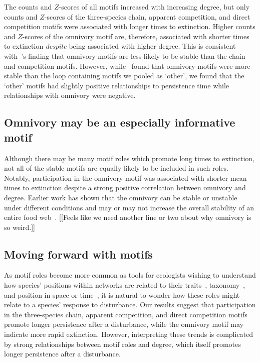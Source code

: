 \documentclass[12pt]{article}
\begin{document}
\begin{spacing}{2.0}
        The counts and $Z$-scores of all motifs increased with increasing degree, but only counts and $Z$-scores of the three-species chain, apparent competition, and direct competition motifs were associated with longer times to extinction. 
        Higher counts and $Z$-scores of the omnivory motif are, therefore, associated with shorter times to extinction \emph{despite} being associated with higher degree.
        This is consistent with~\citet{Borrelli2015a}'s finding that omnivory motifs are less likely to be stable than the chain and competition motifs.
        However, while~\citep{Borrelli2015a} found that omnivory motifs were more stable than the loop containing motifs we pooled as `other', we found that the `other' motifs had slightly positive relationships to persistence time while relationships with omnivory were negative.

        
    \subsection*{Omnivory may be an especially informative motif}
	    
        Although there may be many motif roles which promote long times to extinction, not all of the stable motifs are equally likely to be included in such roles.
        Notably, participation in the omnivory motif was associated with shorter mean times to extinction despite a strong positive correlation between omnivory and degree. 
        Earlier work has shown that the omnivory can be stable or unstable under different conditions and may or may not increase the overall stability of an entire food web~\citep{McCann1997,Emmerson2004,Borrelli2015a,Monteiro2016}.
        [[Feels like we need another line or two about why omnivory is so weird.]]


	\subsection*{Moving forward with motifs}	

        As motif roles become more common as tools for ecologists wishing to understand how species' positions within networks are related to their traits~\citep{Cirtwill2018EcolLett}, taxonomy~\citep{Stouffer2007}, and position in space or time~\citep{Baker2015}, it is natural to wonder how these roles might relate to a species' response to disturbance. 
        Our results suggest that participation in the three-species chain, apparent competition, and direct competition motifs promote longer persistence after a disturbance, while the omnivory motif may indicate more rapid extinction.
        However, interpreting these trends is complicated by strong relationships between motif roles and degree, which itself promotes longer persistence after a disturbance.
        

\end{spacing}
\end{document}
